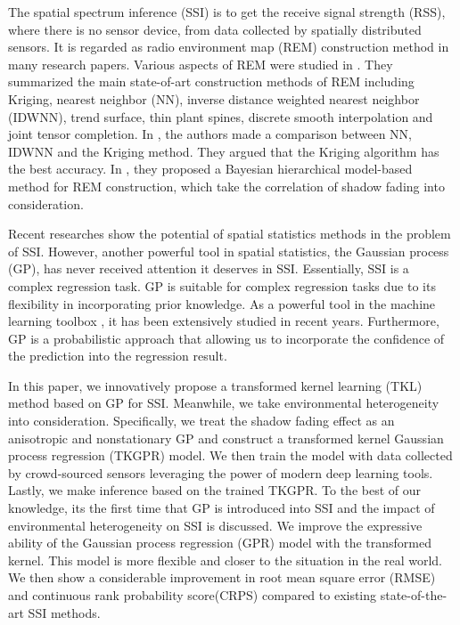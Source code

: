 \documentclass[journal, oneside, twocolumn]{IEEEtran}
\begin{document}
The spatial spectrum inference (SSI) is to get the receive signal strength (RSS), where there is no sensor device, from data collected by spatially distributed sensors. It is regarded as radio environment map (REM) construction method in many research papers\cite{Phillips2012, Pesko2014, Sato2017, Li2018, Han2019, Katagiri2020, Xu2021}. Various aspects of REM were studied in \cite{Li2018}. They summarized the main state-of-art construction methods of REM including Kriging, nearest neighbor (NN), inverse distance weighted nearest neighbor (IDWNN), trend surface, thin plant spines, discrete smooth interpolation and joint tensor completion. In \cite{Han2019}, the authors made a comparison between NN, IDWNN and the Kriging method. They argued that the Kriging algorithm has the best accuracy. In \cite{Xu2021}, they proposed a Bayesian hierarchical model-based method for REM construction, which take the correlation of shadow fading into consideration. 

Recent researches show the potential of spatial statistics methods in the problem of SSI. However, another powerful tool in spatial statistics, the Gaussian process (GP), has never received attention it deserves in SSI. Essentially, SSI is a complex regression task. GP is suitable for complex regression tasks due to its flexibility in incorporating prior knowledge. As a powerful tool in the machine learning toolbox \cite{Rasmussen2006}, it has been extensively studied in recent years\cite{Damianou2013, Wilson2013,Duvenaud2014a,Salimbeni2017a, Lee2018,Wilson2019}.  Furthermore, GP is a probabilistic approach that allowing us to incorporate the confidence of the prediction into the regression result.

In this paper, we innovatively propose a transformed kernel learning (TKL) method based on GP for SSI. Meanwhile, we take environmental heterogeneity into consideration. Specifically, we treat the shadow fading effect as an anisotropic and nonstationary GP and construct a transformed kernel Gaussian process regression (TKGPR) model. We then train the model with data collected by crowd-sourced sensors leveraging the power of modern deep learning tools. Lastly, we make inference based on the trained TKGPR. To the best of our knowledge, its the first time that GP is introduced into SSI and the impact of environmental heterogeneity on SSI is discussed. We improve the expressive ability of the Gaussian process regression (GPR) model with the transformed kernel. This model is more flexible and closer to the situation in the real world. We then show a considerable improvement in root mean square error (RMSE) and continuous rank probability score(CRPS)\cite{Gneiting2007} compared to existing state-of-the-art SSI methods.
\end{document}
